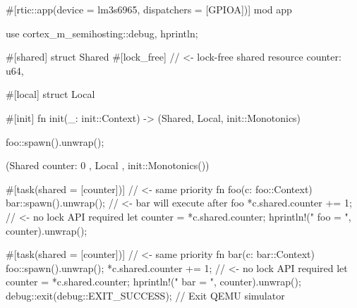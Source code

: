 #[rtic::app(device = lm3s6965, dispatchers = [GPIOA])]
mod app {
    use cortex_m_semihosting::{debug, hprintln};

    #[shared]
    struct Shared {
        #[lock_free] // <- lock-free shared resource
        counter: u64,
    }

    #[local]
    struct Local {}

    #[init]
    fn init(_: init::Context) -> (Shared, Local, init::Monotonics) {
        foo::spawn().unwrap();

        (Shared { counter: 0 }, Local {}, init::Monotonics())
    }

    #[task(shared = [counter])] // <- same priority
    fn foo(c: foo::Context) {
        bar::spawn().unwrap();  // <- bar will execute after foo
        *c.shared.counter += 1; // <- no lock API required
        let counter = *c.shared.counter;
        hprintln!("  foo = {}", counter).unwrap();
    }

    #[task(shared = [counter])] // <- same priority
    fn bar(c: bar::Context) {
        foo::spawn().unwrap();
        *c.shared.counter += 1; // <- no lock API required
        let counter = *c.shared.counter;
        hprintln!("  bar = {}", counter).unwrap();
        debug::exit(debug::EXIT_SUCCESS); // Exit QEMU simulator
    }
}
